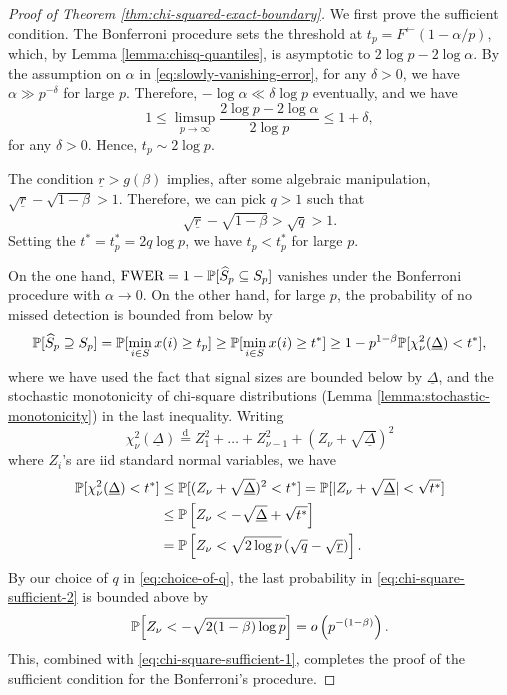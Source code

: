 \begin{proof}[Proof of Theorem \ref{thm:chi-squared-exact-boundary}]
We first prove the sufficient condition.
The Bonferroni procedure sets the threshold at $t_p = F^\leftarrow(1-\alpha/p)$, which, by Lemma \ref{lemma:chisq-quantiles}, is asymptotic to $2\log{p} - 2\log{\alpha}$.
By the assumption on $\alpha$ in \eqref{eq:slowly-vanishing-error}, for any $\delta>0$, we have $\alpha\gg p^{-\delta}$ for large $p$.
Therefore, $-\log\alpha\ll\delta\log{p}$ eventually, and we have
$$
1 \le \limsup_{p\to\infty}\frac{2\log{p} - 2\log{\alpha}}{2\log{p}} \le 1+\delta,
$$
for any $\delta>0$.
Hence, $t_p\sim 2\log{p}$.

The condition $\underline{r} > {{g}}(\beta)$ implies, after some algebraic manipulation,
$\sqrt{\underline{r}} -\sqrt{1-\beta} > 1$.
Therefore, we can pick $q>1$ such that 
\begin{equation} \label{eq:choice-of-q}
    \sqrt{\underline{r}} -\sqrt{1-\beta} > \sqrt{q} > 1.
\end{equation}
Setting the $t^* = t^*_p = 2q\log{p}$, we have $t_p < t^*_p$ for large $p$.

On the one hand, $\text{FWER} = 1 - \P[\widehat{S}_p \subseteq S_p]$ vanishes under the Bonferroni procedure with $\alpha\to0$.
On the other hand, for large $p$, the probability of no missed detection is bounded from below by
\begin{equation} \label{eq:chi-square-sufficient-1}
    \P[\widehat{S}_p \supseteq S_p] 
    = \P[\min_{i\in S} x(i) \ge t_p] 
    \ge \P[\min_{i\in S} x(i) \ge t^*] 
    \ge 1 - p^{1-\beta}\P[\chi_\nu^2(\underline{\Delta}) < t^*],
\end{equation}
where we have used the fact that signal sizes are bounded below by $\underline{\Delta}$, and the stochastic monotonicity of chi-square distributions (Lemma \ref{lemma:stochastic-monotonicity}) in the last inequality.
Writing
$$
\chi_\nu^2(\underline{\Delta}) \stackrel{\mathrm{d}}{=} Z_1^2 + \ldots + Z_{\nu-1}^2 + (Z_\nu + \sqrt{\underline{\Delta}})^2
$$
where $Z_i$'s are iid standard normal variables, we have
\begin{align}
    \P[\chi_\nu^2({\underline{\Delta}}) < t^*]
    &\le \P[(Z_\nu+\sqrt{\underline{\Delta}})^2 < t^*] 
    = \P[|Z_\nu+\sqrt{\underline{\Delta}}| < \sqrt{t^*}]  \nonumber \\
    &\le \P\left[Z_\nu < - \sqrt{\underline{\Delta}} +  \sqrt{t^*}\right] \nonumber \\
    &= \P\left[Z_\nu < \sqrt{2\log{p}}\left(\sqrt{q} - \sqrt{\underline{r}}\right)\right]. \label{eq:chi-square-sufficient-2}
\end{align}
By our choice of $q$ in \eqref{eq:choice-of-q}, the last probability in \eqref{eq:chi-square-sufficient-2}
is bounded above by 
$$
\P\Big[Z_\nu < -\sqrt{2(1-\beta)\log{p}}\Big] = o\left(p^{-(1-\beta)}\right).
$$
This, combined with \eqref{eq:chi-square-sufficient-1}, completes the proof of the sufficient condition for the Bonferroni's procedure.


\end{proof}
